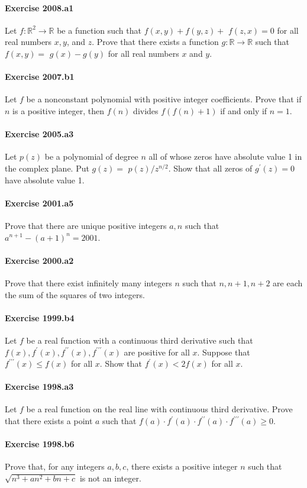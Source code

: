\documentclass{article}
\begin{document}
\paragraph{Exercise 2008.a1} Let $f: \mathbb{R}^2 \rightarrow \mathbb{R}$ be a function such that $f(x, y)+f(y, z)+$ $f(z, x)=0$ for all real numbers $x, y$, and $z$. Prove that there exists a function $g: \mathbb{R} \rightarrow \mathbb{R}$ such that $f(x, y)=$ $g(x)-g(y)$ for all real numbers $x$ and $y$.

\paragraph{Exercise 2007.b1} Let $f$ be a nonconstant polynomial with positive integer coefficients. Prove that if $n$ is a positive integer, then $f(n)$ divides $f(f(n)+1)$ if and only if $n=1$. 

\paragraph{Exercise 2005.a3} Let $p(z)$ be a polynomial of degree $n$ all of whose zeros have absolute value 1 in the complex plane. Put $g(z)=$ $p(z) / z^{n / 2}$. Show that all zeros of $g^{\prime}(z)=0$ have absolute value 1.

\paragraph{Exercise 2001.a5} Prove that there are unique positive integers $a, n$ such that $a^{n+1}-(a+1)^n=2001$.

\paragraph{Exercise 2000.a2} Prove that there exist infinitely many integers $n$ such that $n, n+1, n+2$ are each the sum of the squares of two integers. 

\paragraph{Exercise 1999.b4} Let $f$ be a real function with a continuous third derivative such that $f(x), f^{\prime}(x), f^{\prime \prime}(x), f^{\prime \prime \prime}(x)$ are positive for all $x$. Suppose that $f^{\prime \prime \prime}(x) \leq f(x)$ for all $x$. Show that $f^{\prime}(x)<2 f(x)$ for all $x$.

\paragraph{Exercise 1998.a3} Let $f$ be a real function on the real line with continuous third derivative. Prove that there exists a point $a$ such that
$f(a) \cdot f^{\prime}(a) \cdot f^{\prime \prime}(a) \cdot f^{\prime \prime \prime}(a) \geq 0$. 

\paragraph{Exercise 1998.b6} Prove that, for any integers $a, b, c$, there exists a positive integer $n$ such that $\sqrt{n^3+a n^2+b n+c}$ is not an integer.
\end{document}
